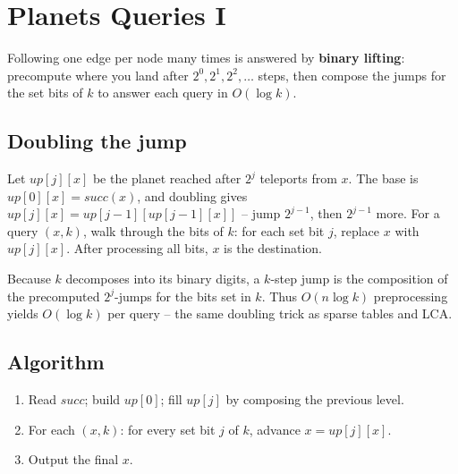 \section{Planets Queries I}
\label{sec:cses-planets-queries-i}


\begin{patternbox}
Following one edge per node many times is answered by \textbf{binary
lifting}: precompute where you land after $2^0,2^1,2^2,\ldots$ steps, then
compose the jumps for the set bits of $k$ to answer each query in
$O(\log k)$.
\end{patternbox}

\subsection*{Doubling the jump}

Let $\textit{up}[j][x]$ be the planet reached after $2^j$ teleports from
$x$. The base is $\textit{up}[0][x]=\textit{succ}(x)$, and doubling gives
$\textit{up}[j][x]=\textit{up}[j-1][\textit{up}[j-1][x]]$ -- jump $2^{j-1}$,
then $2^{j-1}$ more. For a query $(x,k)$, walk through the bits of $k$: for
each set bit $j$, replace $x$ with $\textit{up}[j][x]$. After processing all
bits, $x$ is the destination.

\begin{ideabox}
Because $k$ decomposes into its binary digits, a $k$-step jump is the
composition of the precomputed $2^j$-jumps for the bits set in $k$. Thus
$O(n\log k)$ preprocessing yields $O(\log k)$ per query -- the same doubling
trick as sparse tables and LCA.
\end{ideabox}

\subsection*{Algorithm}

\begin{enumerate}
  \item Read $\textit{succ}$; build $\textit{up}[0]$; fill
        $\textit{up}[j]$ by composing the previous level.
  \item For each $(x,k)$: for every set bit $j$ of $k$, advance $x=
        \textit{up}[j][x]$.
  \item Output the final $x$.
\end{enumerate}


